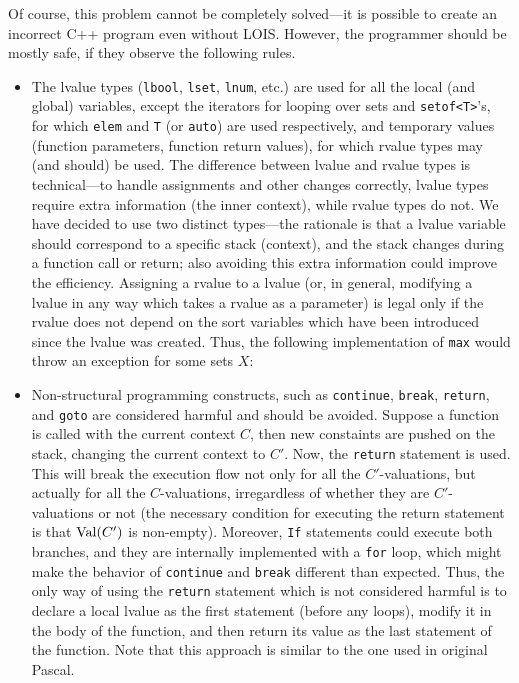 
Of course, this problem cannot be completely solved---it is possible to create an
incorrect C++ program even without LOIS.
However, the programmer should be mostly safe, if they observe the following
rules.

\begin{itemize}
\item The lvalue types ({\tt lbool}, {\tt lset}, {\tt lnum}, etc.) are used
for all the local (and global) variables, except the iterators for looping over
sets and 
\verb-setof<T>-'s, for which
\verb-elem- and \verb-T- (or \verb-auto-) are used respectively, and temporary values
(function
parameters, function return values), for which rvalue types may (and should) be used.
The difference between lvalue and rvalue types is technical---to handle
assignments and other changes correctly, lvalue types require extra
information (the inner context), while rvalue types do not.
We have decided to use two distinct types---the rationale is that 
a lvalue variable should correspond to a specific stack (context), and the stack
changes during a function call or return;
also avoiding this
extra information could improve the efficiency.
Assigning a rvalue to a lvalue (or, in general, modifying a lvalue in any way
which takes a rvalue as a parameter) is legal only if the rvalue does not
depend on the sort variables which have been introduced since the
lvalue was created. Thus, the following implementation of
{\tt max} would throw an exception for some sets $X$:

\item Non-structural programming constructs, such as {\tt continue},
{\tt break}, {\tt return}, and {\tt goto} are considered harmful and
should be avoided. Suppose a function is called with the current context $C$,
then new constaints are pushed on the stack, changing the current context
to $C'$. Now, the {\tt return} statement is used. This will break the execution flow
not only for all the $C'$-valuations, but actually 
for all the $C$-valuations, irregardless of whether they are $C'$-valuations
or not (the necessary condition for executing 
the return statement is that ${\mbox{Val}(C')}$ is non-empty).
Moreover, {\tt If} statements could execute both branches, and they are
internally implemented with a {\tt for} loop, which might make
the behavior of {\tt continue} and {\tt break} different than expected.
Thus, the only way of using the {\tt return} statement which is not considered
harmful is to  declare a local lvalue as the first statement (before any loops), 
modify it in the body of the function,
and then return its value as the last statement of the function.
Note that this approach is similar to the one used in original Pascal.
\end{itemize}


